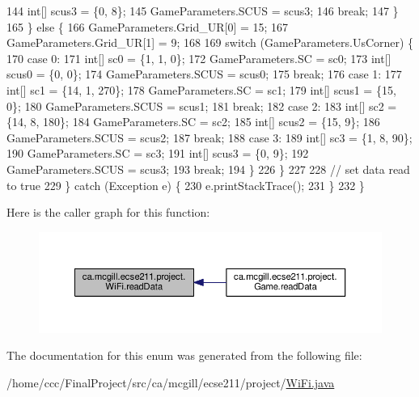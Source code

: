 \begin{DoxyCode}
144             \textcolor{keywordtype}{int}[] scus3 = \{0, 8\};
145             GameParameters.SCUS = scus3;
146             \textcolor{keywordflow}{break};
147         \}
165       \} \textcolor{keywordflow}{else} \{
166         GameParameters.Grid\_UR[0] = 15;
167         GameParameters.Grid\_UR[1] = 9;
168 
169         \textcolor{keywordflow}{switch} (GameParameters.UsCorner) \{
170           \textcolor{keywordflow}{case} 0:
171             \textcolor{keywordtype}{int}[] sc0 = \{1, 1, 0\};
172             GameParameters.SC = sc0;
173             \textcolor{keywordtype}{int}[] scus0 = \{0, 0\};
174             GameParameters.SCUS = scus0;
175             \textcolor{keywordflow}{break};
176           \textcolor{keywordflow}{case} 1:
177             \textcolor{keywordtype}{int}[] sc1 = \{14, 1, 270\};
178             GameParameters.SC = sc1;
179             \textcolor{keywordtype}{int}[] scus1 = \{15, 0\};
180             GameParameters.SCUS = scus1;
181             \textcolor{keywordflow}{break};
182           \textcolor{keywordflow}{case} 2:
183             \textcolor{keywordtype}{int}[] sc2 = \{14, 8, 180\};
184             GameParameters.SC = sc2;
185             \textcolor{keywordtype}{int}[] scus2 = \{15, 9\};
186             GameParameters.SCUS = scus2;
187             \textcolor{keywordflow}{break};
188           \textcolor{keywordflow}{case} 3:
189             \textcolor{keywordtype}{int}[] sc3 = \{1, 8, 90\};
190             GameParameters.SC = sc3;
191             \textcolor{keywordtype}{int}[] scus3 = \{0, 9\};
192             GameParameters.SCUS = scus3;
193             \textcolor{keywordflow}{break};
194         \}
226       \}
227 
228       \textcolor{comment}{// set data read to true}
229     \} \textcolor{keywordflow}{catch} (Exception e) \{
230       e.printStackTrace();
231     \}
232   \}
\end{DoxyCode}
Here is the caller graph for this function\+:\nopagebreak
\begin{figure}[H]
\begin{center}
\leavevmode
\includegraphics[width=350pt]{enumca_1_1mcgill_1_1ecse211_1_1project_1_1_wi_fi_a3488726983cda70dbde6f05c9c762f16_icgraph}
\end{center}
\end{figure}


The documentation for this enum was generated from the following file\+:\begin{DoxyCompactItemize}
\item 
/home/ccc/\+Final\+Project/src/ca/mcgill/ecse211/project/\hyperlink{_wi_fi_8java}{Wi\+Fi.\+java}\end{DoxyCompactItemize}
